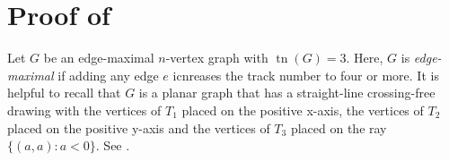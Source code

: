\documentclass{patmorin}
\DeclareMathOperator{\tr}{tn}
\begin{document}
% 
% 
% 
% 
% 
% 


\section{Proof of }

Let $G$ be an edge-maximal $n$-vertex graph with $\tr(G)=3$.  
Here, $G$ is \emph{edge-maximal} if adding any edge $e$ icnreases the track number to four or more. It is
helpful to recall that $G$ is a planar graph that has a straight-line
crossing-free drawing with the vertices of $T_1$ placed on the positive x-axis,
the vertices of $T_2$ placed on the positive y-axis and the vertices of
$T_3$ placed on the ray $\{(a,a):a<0\}$. See .
\end{document}
